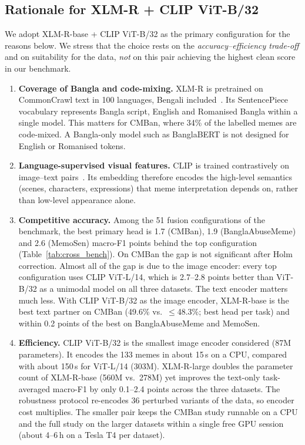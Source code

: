 \subsection{Rationale for XLM-R + CLIP ViT-B/32}
\label{sec:method:why}

We adopt XLM-R-base + CLIP ViT-B/32 as the primary configuration for the reasons below. We stress that the choice
rests on the \emph{accuracy--efficiency trade-off} and on suitability for the data, \emph{not} on this pair
achieving the highest clean score in our benchmark.

\begin{enumerate}
  \item \textbf{Coverage of Bangla and code-mixing.} XLM-R is pretrained on CommonCrawl text in 100 languages,
  Bengali included~\cite{conneau2020xlmr}. Its SentencePiece vocabulary represents Bangla script, English and
  Romanised Bangla within a single model. This matters for CMBan, where 34\% of the labelled memes are code-mixed.
  A Bangla-only model such as BanglaBERT is not designed for English or Romanised tokens.

  \item \textbf{Language-supervised visual features.} CLIP is trained contrastively on image--text
  pairs~\cite{radford2021clip}. Its embedding therefore encodes the high-level semantics (scenes, characters,
  expressions) that meme interpretation depends on, rather than low-level appearance alone.

  \item \textbf{Competitive accuracy.} Among the 51 fusion configurations of the benchmark, the best primary head is
  1.7 (CMBan), 1.9 (BanglaAbuseMeme) and 2.6 (MemoSen) macro-F1 points behind the top configuration
  (Table~\ref{tab:cross_bench}). On CMBan the gap is not significant after Holm correction. Almost all of the gap is
  due to the image encoder: every top configuration uses CLIP ViT-L/14, which is 2.7--2.8 points better than
  ViT-B/32 as a unimodal model on all three datasets. The text encoder matters much less. With CLIP ViT-B/32 as the
  image encoder, XLM-R-base is the best text partner on CMBan (49.6\% vs.\ $\leq$48.3\%; best head per task) and
  within 0.2 points of the best on BanglaAbuseMeme and MemoSen.

  \item \textbf{Efficiency.} CLIP ViT-B/32 is the smallest image encoder considered (87M parameters). It encodes
  the 133 memes in about 15\,s on a CPU, compared with about 150\,s for ViT-L/14 (303M). XLM-R-large doubles the
  parameter count of XLM-R-base (560M vs.\ 278M) yet improves the text-only task-averaged macro-F1 by only 0.1--2.4
  points across the three datasets. The robustness protocol re-encodes 36 perturbed variants of the data, so encoder
  cost multiplies. The smaller pair keeps the CMBan study runnable on a CPU and the full study on the larger
  datasets within a single free GPU session (about 4--6\,h on a Tesla T4 per dataset).


\end{enumerate}
